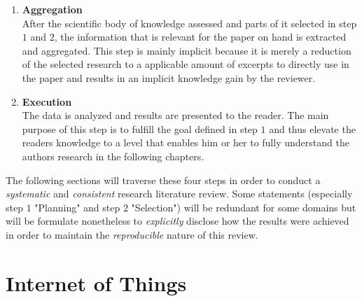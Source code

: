 \begin{enumerate}
    \item
    \textbf{Aggregation}\\
    After the scientific body of knowledge assessed and parts of it selected in step $1$ and $2$, the information that is relevant for the paper on hand is extracted and aggregated. This step is mainly implicit because it is merely a reduction of the selected research to a applicable amount of excerpts to directly use in the paper and results in an implicit knowledge gain by the reviewer.
    \item
    \textbf{Execution}\\
    The data is analyzed and results are presented to the reader. The main purpose of this step is to fulfill the goal defined in step $1$ and thus elevate the readers knowledge to a level that enables him or her to fully understand the authors research in the following chapters.
\end{enumerate}

The following sections will traverse these four steps in order to conduct a \textit{systematic} and \textit{consistent} research literature review. Some statements (especially step $1$ "Planning" and step $2$ "Selection") will be redundant for some domains but will be formulate nonetheless to \textit{explicitly} disclose how the results were achieved in order to maintain the \textit{reproducible} nature of this review.


\section{Internet of Things}

